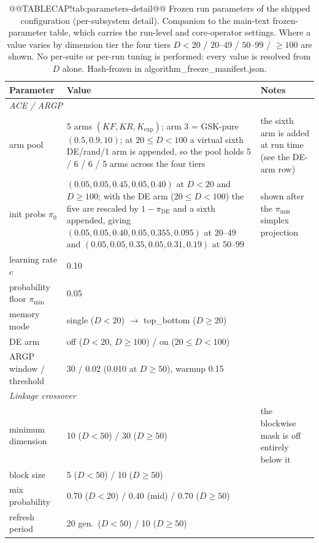 \documentclass[10pt,a4paper]{article}
\begin{document}
\begin{table}[H]
\caption{@@TABLECAP!tab:parameters-detail@@ Frozen run parameters of the shipped configuration (per-subsystem
detail). Companion to the main-text frozen-parameter table, which carries the
run-level and core-operator settings. Where a value varies by dimension tier the
four tiers $D{<}20$ / $20$--$49$ / $50$--$99$ / ${\ge}100$ are shown. No
per-suite or per-run tuning is performed: every value is resolved from $D$
alone. Hash-frozen in algorithm\_freeze\_manifest.json.}
\label{tab:parameters-detail}
\small






\begin{tabular}{p{2.9cm} p{5.8cm} p{4.8cm}}
\toprule
\textbf{Parameter} & \textbf{Value} & \textbf{Notes}\\
\midrule
\multicolumn{3}{l}{\emph{ACE / ARGP}}\\
\midrule
arm pool & 5 arms $(KF,KR,K_{\exp})$; arm 3 = GSK-pure $(0.5,0.9,10)$; at $20{\le}D{<}100$ a virtual sixth DE/rand/1 arm is appended, so the pool holds 5 / 6 / 6 / 5 arms across the four tiers & the sixth arm is added at run time (see the DE-arm row)\\
init probs $\pi_0$ & $(0.05,0.05,0.45,0.05,0.40)$ at $D{<}20$ and $D{\ge}100$; with the DE arm ($20{\le}D{<}100$) the five are rescaled by $1-\pi_{\mathrm{DE}}$ and a sixth appended, giving $(0.05,0.05,0.40,0.05,0.355,0.095)$ at $20$--$49$ and $(0.05,0.05,0.35,0.05,0.31,0.19)$ at $50$--$99$ & shown after the $\pi_{\min}$ simplex projection\\
learning rate $c$ & 0.10 & \\
probability floor $\pi_{\min}$ & 0.05 & \\
memory mode & single ($D{<}20$) $\to$ top\_bottom ($D\ge20$) & \\
DE arm & off ($D{<}20$, $D\ge100$) / on ($20{\le}D{<}100$) & \\
ARGP window / threshold & 30 / 0.02 (0.010 at $D\ge50$), warmup 0.15 & \\
\midrule
\multicolumn{3}{l}{\emph{Linkage crossover}}\\
\midrule
minimum dimension & 10 ($D{<}50$) / 30 ($D\ge50$) & the blockwise mask is off entirely below it\\
block size & 5 ($D{<}50$) / 10 ($D\ge50$) & \\
mix probability & 0.70 ($D{<}20$) / 0.40 (mid) / 0.70 ($D\ge50$) & \\
refresh period & 20 gen.\ ($D{<}50$) / 10 ($D\ge50$) & \\

\end{tabular}
\end{table}
\end{document}

